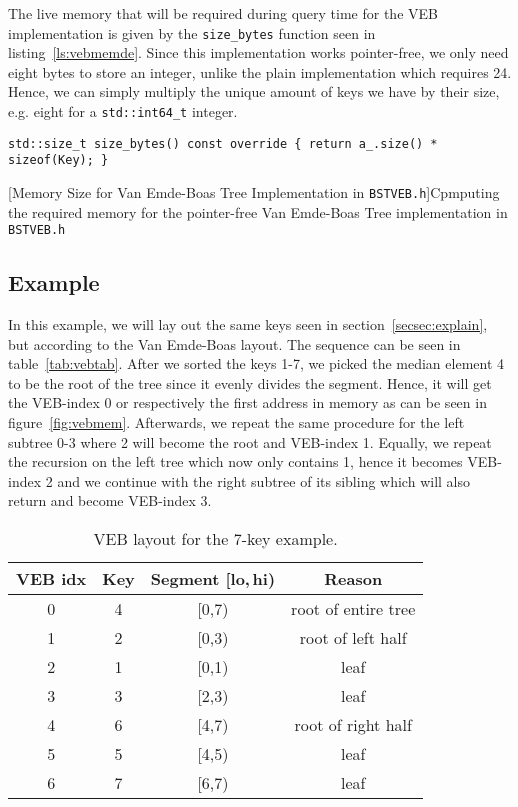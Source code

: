 \documentclass{article}
\begin{document}
The live memory that will be required during query time for the VEB implementation is given by the \texttt{size\_bytes} function seen in listing~\ref{ls:vebmemde}. Since this implementation works pointer-free, we only need eight bytes to store an integer, unlike the plain implementation which requires 24. Hence, we can simply multiply the unique amount of keys we have by their size, e.g. eight for a \texttt{std::int64\_t} integer. 
\begin{lstlisting}
std::size_t size_bytes() const override { return a_.size() * sizeof(Key); }
\end{lstlisting}
[Memory Size for Van Emde-Boas Tree Implementation in \texttt{BSTVEB.h}]{Cpmputing the required memory for the pointer-free Van Emde-Boas Tree implementation in \texttt{BSTVEB.h}}
\label{ls:vebmemde}


\subsection{Example}
In this example, we will lay out the same keys seen in section~\ref{secsec:explain}, but according to the Van Emde-Boas layout. The sequence can be seen in table~\ref{tab:vebtab}. After we sorted the keys 1-7, we picked the median element 4 to be the root of the tree since it evenly divides the segment. Hence, it will get the VEB-index 0 or respectively the first address in memory as can be seen in figure~\ref{fig:vebmem}. Afterwards, we repeat the same procedure for the left subtree 0-3 where 2 will become the root and VEB-index 1. Equally, we repeat the recursion on the left tree which now only contains 1, hence it becomes VEB-index 2 and we continue with the right subtree of its sibling which will also return and become VEB-index 3. 
\begin{table}[h!]
  \centering
  \caption[VEB Array Layout Table]{VEB layout for the 7-key example.}
  \label{tab:veb7}
  \begin{tabular}{cccc}
    \toprule
    \textbf{VEB idx} & \textbf{Key} & \textbf{Segment [lo,\,hi)} & \textbf{Reason} \\
    \midrule
    0 & 4 & {[0,7)} & root of entire tree \\
    1 & 2 & {[0,3)} & root of left half \\
    2 & 1 & {[0,1)} & leaf \\
    3 & 3 & {[2,3)} & leaf \\
    4 & 6 & {[4,7)} & root of right half \\
    5 & 5 & {[4,5)} & leaf \\
    6 & 7 & {[6,7)} & leaf \\
    \bottomrule
  \end{tabular}
\end{table}
\label{tab:vebtab}
\end{document}
